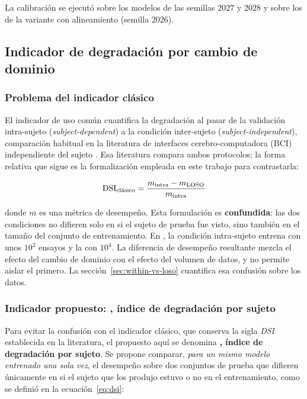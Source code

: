La calibración se ejecutó sobre los modelos \loso{} de las semillas $2027$ y $2028$ y sobre
los de la variante con alineamiento (semilla $2026$).


\subsection{Indicador de degradación por cambio de dominio}
\label{sec:dsi}

\subsubsection{Problema del indicador clásico}

El indicador de uso común cuantifica la degradación al pasar de la validación
intra-sujeto (\textit{subject-dependent}) a la condición inter-sujeto
(\textit{subject-independent}), comparación habitual en la literatura de interfaces cerebro-computadora
(BCI) independiente del sujeto \cite{kwon2020}. Esa literatura compara ambos protocolos; la
forma relativa que sigue es la formalización empleada en este trabajo para contrastarla:

\begin{equation}
\mathrm{DSI}_{\text{clásico}} =
  \frac{m_{\text{intra}} - m_{\text{LOSO{}}}}{m_{\text{intra}}}
\label{eq:dsi-clasico}
\end{equation}

donde $m$ es una métrica de desempeño. Esta formulación es \textbf{confundida}:
las dos condiciones no difieren solo en si el sujeto de prueba fue visto, sino
también en el tamaño del conjunto de entrenamiento. En \openbmi{}, la condición
intra-sujeto entrena con unos $10^2$ ensayos y la \loso{} con $10^4$. La
diferencia de desempeño resultante mezcla el efecto del cambio de dominio con el
efecto del volumen de datos, y no permite aislar el primero. La
sección~\ref{sec:within-vs-loso} cuantifica esa confusión sobre los datos.

\subsubsection{Indicador propuesto: \texorpdfstring{\dsi{}}{IDS}, índice de degradación por sujeto}

Para evitar la confusión con el indicador clásico, que conserva la sigla \textit{DSI}
establecida en la literatura, el propuesto aquí se denomina \textbf{\dsi{}, índice de
degradación por sujeto}. Se propone comparar, \emph{para un mismo modelo entrenado una sola
vez}, el desempeño sobre dos conjuntos de prueba que difieren únicamente en si el sujeto
que los produjo estuvo o no en el entrenamiento, como se definió en la ecuación~\eqref{eq:dsi}:

